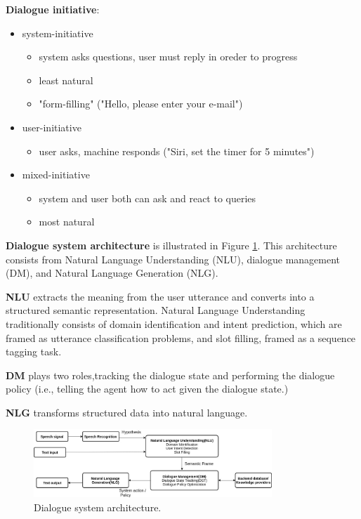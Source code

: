 \textbf{Dialogue initiative}:
\begin{itemize}
  \item system-initiative
    \begin{itemize}
      \item system asks questions, user must reply in oreder to progress
      \item least natural
      \item "form-filling" ("Hello, please enter your e-mail") 
    \end{itemize}
  \item user-initiative
    \begin{itemize}
      \item user asks, machine responds ("Siri, set the timer for 5 minutes")
    \end{itemize}
  \item mixed-initiative
    \begin{itemize}
      \item system and user both can ask and react to queries
      \item most natural
    \end{itemize}
\end{itemize}

\textbf{Dialogue system architecture} is illustrated in Figure \ref{ds architecture}. This architecture consists from Natural Language Understanding (NLU), dialogue management (DM), and Natural Language Generation (NLG).

\textbf{NLU} extracts the meaning from the user utterance and converts into a structured semantic representation. Natural Language Understanding traditionally consists of domain identification and intent prediction, which are framed as utterance classification problems, and slot filling, framed as a sequence tagging task.

\textbf{DM} plays two roles,tracking the dialogue state and performing the dialogue policy (i.e., telling the agent how to act given the dialogue state.)

\textbf{NLG} transforms structured data into natural language.\cite{open_domain_neural_ds}
\begin{figure}[hbt]
  \centering
  \includegraphics[width=0.8\textwidth]{figures/ds_arcitecture.jpg}
  \caption{Dialogue system architecture.}
  \label{ds architecture}
\end{figure}

